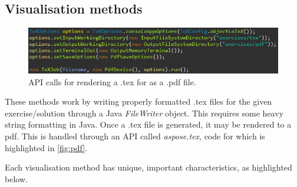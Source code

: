 \documentclass{l4proj}
\begin{document}
\subsection{Visualisation methods}

\begin{figure}
    \centering
    \includegraphics[width=0.9\linewidth]{images/pdf.png}    

    \caption{API calls for rendering a .tex for as a .pdf file.}
    \label{fig:pdf} 
\end{figure}

These methods work by writing properly formatted .tex files for the given exercise/solution through a Java \emph{FileWriter} object. This requires some heavy string formatting in Java. Once a .tex file is generated, it may be rendered to a pdf. This is handled through an API called \emph{aspose.tex}, code for which is highlighted in \autoref{fig:pdf}.

Each visualisation method has unique, important characteristics, as highlighted below.
\end{document}
